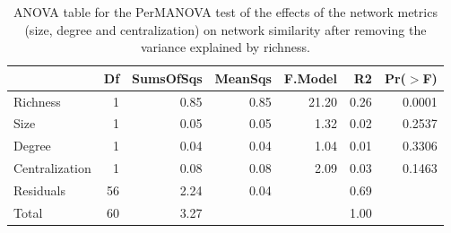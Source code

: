 \documentclass[11pt]{amsart}
\begin{document}
\begin{center} 
\begin{table}[ht]
\begin{center}
\begin{tabular}{lrrrrrr}
  \hline
 & Df & SumsOfSqs & MeanSqs & F.Model & R2 & Pr($>$F) \\ 
  \hline
Richness & 1 & 0.85 & 0.85 & 21.20 & 0.26 & 0.0001 \\ 
  Size & 1 & 0.05 & 0.05 & 1.32 & 0.02 & 0.2537 \\ 
  Degree & 1 & 0.04 & 0.04 & 1.04 & 0.01 & 0.3306 \\ 
  Centralization & 1 & 0.08 & 0.08 & 2.09 & 0.03 & 0.1463 \\ 
  Residuals & 56 & 2.24 & 0.04 &  & 0.69 &  \\ 
  Total & 60 & 3.27 &  &  & 1.00 &  \\ 
   \hline
\end{tabular}
\caption{ANOVA table for the PerMANOVA test of the effects of the network metrics (size, degree and centralization) on network similarity after removing the variance explained by richness.}
\end{center}
\end{table}\end{center} 

\pagebreak
\end{document}
